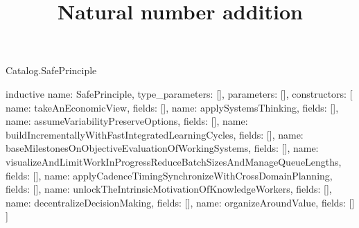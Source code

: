 \begin{lexlean}{Catalog.SafePrinciple}
\title{Natural number addition}
\begin{semanticmodule}
inductive{
  name: SafePrinciple,
  type_parameters: [],
  parameters: [],
  constructors: [
    {name: takeAnEconomicView, fields: []},
    {name: applySystemsThinking, fields: []},
    {name: assumeVariabilityPreserveOptions, fields: []},
    {name: buildIncrementallyWithFastIntegratedLearningCycles, fields: []},
    {name: baseMilestonesOnObjectiveEvaluationOfWorkingSystems, fields: []},
    {name: visualizeAndLimitWorkInProgressReduceBatchSizesAndManageQueueLengths, fields: []},
    {name: applyCadenceTimingSynchronizeWithCrossDomainPlanning, fields: []},
    {name: unlockTheIntrinsicMotivationOfKnowledgeWorkers, fields: []},
    {name: decentralizeDecisionMaking, fields: []},
    {name: organizeAroundValue, fields: []}
  ]
}
\end{semanticmodule}
\end{lexlean}
